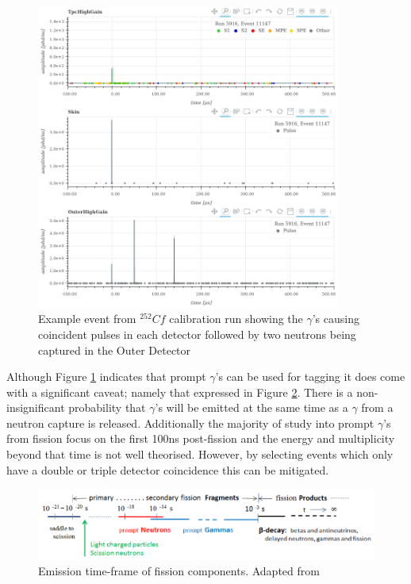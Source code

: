 \begin{figure}[!htbp]
\includegraphics[width=10cm]{Figures/NeutronCaptureTime/cf252_eventviewer_5916.png}
\centering
\caption{Example event from ${}^{252}{Cf}$ calibration run showing the $\gamma$'s causing coincident pulses in each detector followed by two neutrons being captured in the Outer Detector}
\label{fig:cf252_event_viewer}
\end{figure}

\par
Although Figure \ref{fig:cf252_event_viewer} indicates that prompt $\gamma$'s can be used for tagging it does come with a significant caveat; namely that expressed in Figure \ref{fig:fission_fragments_time}.
There is a non-insignificant probability that $\gamma$'s will be emitted at the same time as a $\gamma$ from a neutron capture is released.
Additionally the majority of study into prompt $\gamma$'s from fission focus on the first 100ns post-fission and the energy and multiplicity beyond that time is not well theorised. 
However, by selecting events which only have a double or triple detector coincidence this can be mitigated.


\begin{figure}[!htbp]
\includegraphics[width=13cm]{Figures/NeutronCaptureTime/fission_fragment_times.png}
\centering
\caption{Emission time-frame of fission components. Adapted from \cite{cf252_fission_ref}}
\label{fig:fission_fragments_time}
\end{figure}



